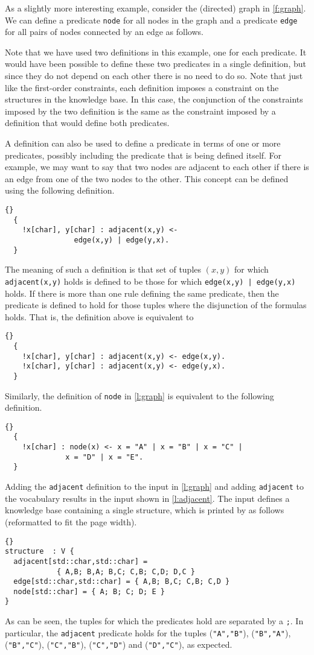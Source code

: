 \documentclass{article}
\begin{document}
As a slightly more interesting example, consider the (directed)
graph in \autoref{f:graph}.  We can define a predicate \texttt{node}
for all nodes in the graph and a predicate \texttt{edge} for all
pairs of nodes connected by an edge as follows.

Note that we have used two definitions in this example, one for
each predicate.  It would have been possible to define these two
predicates in a single definition, but since they do not depend
on each other there is no need to do so.
Note that just like the first-order constraints, each definition
imposes a constraint on the structures in the knowledge base.
In this case, the conjunction of the constraints imposed by
the two definition is the same as the constraint imposed by
a definition that would define both predicates.

A definition can also be used to define a predicate in terms
of one or more predicates, possibly including the predicate that
is being defined itself.
For example, we may want to say that two nodes are adjacent
to each other if there is an edge from one of the two nodes
to the other.  This concept can be defined using the following
definition.
\begin{lstlisting}{}
  {
    !x[char], y[char] : adjacent(x,y) <-
				edge(x,y) | edge(y,x).
  }
\end{lstlisting}
The meaning of such a definition is that set of tuples $(x,y)$
for which \texttt{adjacent(x,y)} holds is defined to be those
for which \texttt{edge(x,y) | edge(y,x)} holds.
If there is more than one rule defining the same predicate,
then the predicate is defined to hold for those tuples where
the disjunction of the formulas holds.
That is, the definition above is equivalent to
\begin{lstlisting}{}
  {
    !x[char], y[char] : adjacent(x,y) <- edge(x,y).
    !x[char], y[char] : adjacent(x,y) <- edge(y,x).
  }
\end{lstlisting}
Similarly, the definition of \texttt{node} in \autoref{l:graph}
is equivalent to the following definition.
\begin{lstlisting}{}
  {
    !x[char] : node(x) <- x = "A" | x = "B" | x = "C" |
			  x = "D" | x = "E".
  }
\end{lstlisting}

Adding the \texttt{adjacent} definition to the input in \autoref{l:graph} and
adding \texttt{adjacent}
to the vocabulary results in the input shown in \autoref{l:adjacent}.
The input defines a knowledge base containing a single structure,
which is printed by \idp
as follows (reformatted to fit the page width).
\begin{lstlisting}{}
structure  : V {
  adjacent[std::char,std::char] =
		    { A,B; B,A; B,C; C,B; C,D; D,C }
  edge[std::char,std::char] = { A,B; B,C; C,B; C,D }
  node[std::char] = { A; B; C; D; E }
}

\end{lstlisting}
As can be seen, the tuples for which the predicates hold are separated
by a \lstinline{;}.  In particular, the \texttt{adjacent} predicate
holds for the tuples
(\texttt{"A","B"}),
(\texttt{"B","A"}),
(\texttt{"B","C"}),
(\texttt{"C","B"}),
(\texttt{"C","D"}) and
(\texttt{"D","C"}),
as expected.
\end{document}
